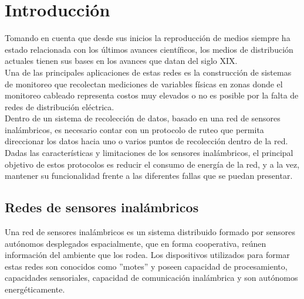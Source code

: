 \chapter{Introducción}
Tomando en cuenta que desde sus inicios la reproducción de medios siempre ha estado relacionada con los últimos avances científicos, los medios de distribución actuales tienen sus bases en los avances que datan  del siglo XIX.\\

Una de las principales aplicaciones de estas redes es la construcción de sistemas de monitoreo que recolectan mediciones de variables físicas en zonas donde el monitoreo cableado representa costos muy elevados o no es posible por la falta de redes de distribución eléctrica\cite{WileyWSN}.\\

Dentro de un sistema de recolección de datos, basado en una red de sensores inalámbricos, es necesario contar con un protocolo de ruteo que permita direccionar los datos hacia uno o varios puntos de recolección dentro de la red. Dadas las características y limitaciones de los sensores inalámbricos, el principal objetivo de estos protocolos es reducir el consumo de energía de la red, y a la vez, mantener su funcionalidad frente a las diferentes fallas que se puedan presentar\cite{WSNSurvey}.\\

\section{Redes de sensores inalámbricos}
Una red de sensores inalámbricos es un sistema distribuido formado por sensores autónomos desplegados espacialmente, que en forma cooperativa, reúnen información del ambiente que los rodea. Los dispositivos utilizados para formar estas redes son conocidos como ''motes'' y poseen capacidad de procesamiento, capacidades sensoriales, capacidad de comunicación inalámbrica y son autónomos energéticamente.


